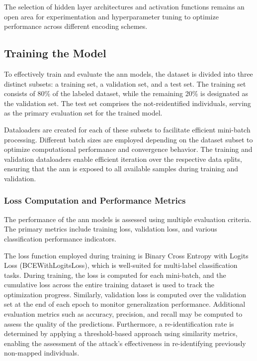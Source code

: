 The selection of hidden layer architectures and activation functions remains an open area for experimentation and hyperparameter tuning to optimize performance across different encoding schemes.

\subsection{Training the Model} \label{sec:training}

To effectively train and evaluate the \ac{ann} models, the dataset is divided into three distinct subsets: a training set, a validation set, and a test set.
The training set consists of 80\% of the labeled dataset, while the remaining 20\% is designated as the validation set.
The test set comprises the not-reidentified individuals, serving as the primary evaluation set for the trained model.

Dataloaders are created for each of these subsets to facilitate efficient mini-batch processing.
Different batch sizes are employed depending on the dataset subset to optimize computational performance and convergence behavior.
The training and validation dataloaders enable efficient iteration over the respective data splits, ensuring that the \ac{ann} is exposed to all available samples during training and validation.

\subsubsection{Loss Computation and Performance Metrics}

The performance of the \ac{ann} models is assessed using multiple evaluation criteria.
The primary metrics include training loss, validation loss, and various classification performance indicators.

The loss function employed during training is Binary Cross Entropy with Logits Loss (BCEWithLogitsLoss), which is well-suited for multi-label classification tasks.
During training, the loss is computed for each mini-batch, and the cumulative loss across the entire training dataset is used to track the optimization progress.
Similarly, validation loss is computed over the validation set at the end of each epoch to monitor generalization performance.
Additional evaluation metrics such as accuracy, precision, and recall may be computed to assess the quality of the predictions.
Furthermore, a re-identification rate is determined by applying a threshold-based approach using similarity metrics, enabling the assessment of the attack’s effectiveness in re-identifying previously non-mapped individuals.

